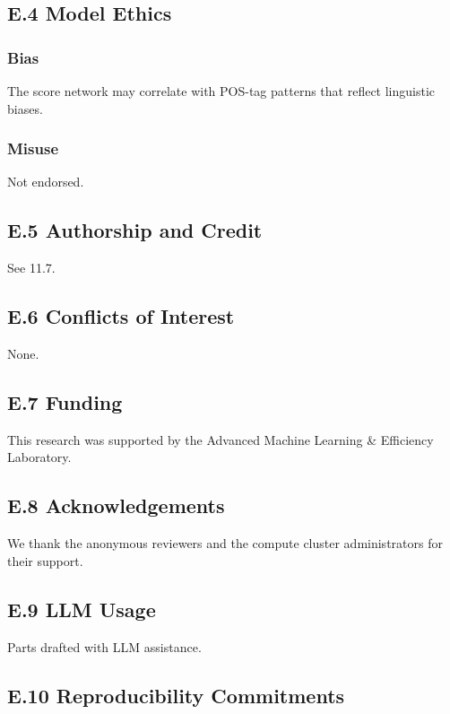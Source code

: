 \subsection{E.4 Model Ethics}

\subsubsection{Bias}
The score network may correlate with POS-tag patterns that reflect 
linguistic biases.

\subsubsection{Misuse}
Not endorsed.

\subsection{E.5 Authorship and Credit}

See  11.7.

\subsection{E.6 Conflicts of Interest}

None.

\subsection{E.7 Funding}

This research was supported by the Advanced Machine Learning \& Efficiency Laboratory.

\subsection{E.8 Acknowledgements}

We thank the anonymous reviewers and the compute cluster administrators for their support.

\subsection{E.9 LLM Usage}

Parts drafted with LLM assistance.

\subsection{E.10 Reproducibility Commitments}

